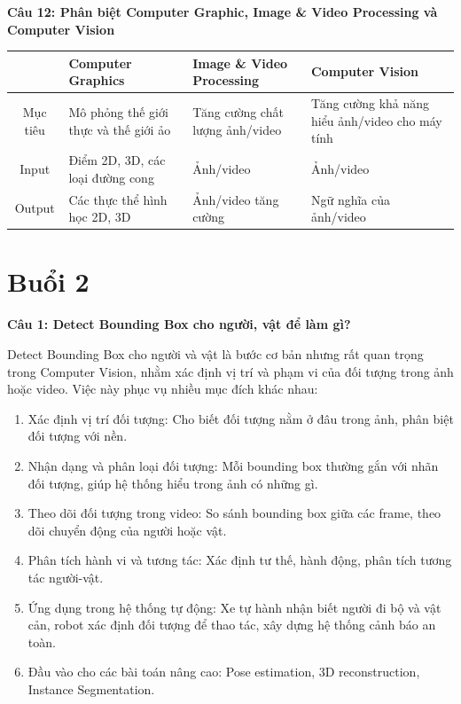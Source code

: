 \textbf{Câu 12: Phân biệt Computer Graphic, Image \& Video Processing và Computer Vision}

\begin{table}[H]
	\centering
	\begin{tabular}{|c|p{4cm}|p{4cm}|p{4cm}|}
		\hline
		& Computer Graphics & Image \& Video Processing & Computer Vision \\ \hline
		Mục tiêu & Mô phỏng thế giới thực và thế giới ảo & Tăng cường chất lượng ảnh/video & Tăng cường khả năng hiểu ảnh/video cho máy tính \\ \hline
		Input & Điểm 2D, 3D, các loại đường cong & Ảnh/video & Ảnh/video \\ \hline
		Output & Các thực thể hình học 2D, 3D & Ảnh/video tăng cường & Ngữ nghĩa của ảnh/video \\ \hline
	\end{tabular}
\end{table}

\section{Buổi 2}

\textbf{Câu 1: Detect Bounding Box cho người, vật để làm gì?}

Detect Bounding Box cho người và vật là bước cơ bản nhưng rất quan trọng trong Computer Vision, nhằm xác định vị trí và phạm vi của đối tượng trong ảnh hoặc video. Việc này phục vụ nhiều mục đích khác nhau:

\begin{enumerate}
	\item Xác định vị trí đối tượng: Cho biết đối tượng nằm ở đâu trong ảnh, phân biệt đối tượng với nền.
	
	\item Nhận dạng và phân loại đối tượng: Mỗi bounding box thường gắn với nhãn đối tượng, giúp hệ thống hiểu trong ảnh có những gì.
	
	\item Theo dõi đối tượng trong video: So sánh bounding box giữa các frame, theo dõi chuyển động của người hoặc vật.
	
	\item Phân tích hành vi và tương tác: Xác định tư thế, hành động, phân tích tương tác người-vật.
	
	\item Ứng dụng trong hệ thống tự động: Xe tự hành nhận biết người đi bộ và vật cản, robot xác định đối tượng để thao tác, xây dựng hệ thống cảnh báo an toàn.
	
	\item Đầu vào cho các bài toán nâng cao: Pose estimation, 3D reconstruction, Instance Segmentation.
\end{enumerate}

